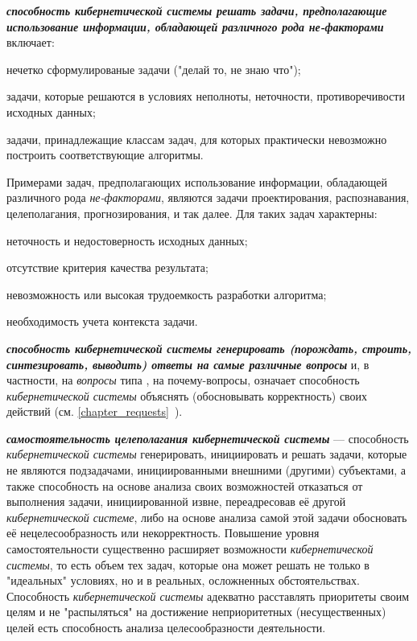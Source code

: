 \textbf{\textit{способность кибернетической системы решать задачи, предполагающие использование информации, обладающей различного рода не-факторами}} включает:
\begin{textitemize}
	\item нечетко сформулированые задачи ("делай то, не знаю что");
	\item задачи, которые решаются в условиях неполноты, неточности, противоречивости исходных данных;
	\item задачи, принадлежащие классам задач, для которых практически невозможно построить соответствующие алгоритмы.
\end{textitemize}
Примерами задач, предполагающих использование информации, обладающей различного рода \textit{не-факторами}, являются задачи проектирования, распознавания, целеполагания, прогнозирования, и так далее.
Для таких задач характерны:
\begin{textitemize}
    \item неточность и недостоверность исходных данных;
    \item отсутствие критерия качества результата;
    \item невозможность или высокая трудоемкость разработки алгоритма;
    \item необходимость учета контекста задачи.
\end{textitemize}

\textbf{\textit{способность кибернетической системы генерировать (порождать, строить, синтезировать, выводить) ответы на самые различные вопросы}} и, в частности, на \textit{вопросы} типа , на почему-вопросы, означает способность \textit{кибернетической системы} объяснять (обосновывать корректность) своих действий (см. \ref{chapter_requests}~).

\textbf{\textit{самостоятельность целеполагания кибернетической системы}} --- способность \textit{кибернетической системы} генерировать, инициировать и решать задачи, которые не являются подзадачами, инициированными внешними (другими) субъектами, а также способность на основе анализа своих возможностей отказаться от выполнения задачи, инициированной извне, переадресовав её другой \textit{кибернетической системе}, либо на основе анализа самой этой задачи обосновать её нецелесообразность или некорректность.  Повышение уровня самостоятельности существенно расширяет возможности \textit{кибернетической системы}, то есть объем тех задач, которые она может решать не только в "идеальных"{} условиях, но и в реальных, осложненных обстоятельствах. Способность \textit{кибернетической системы} адекватно расставлять приоритеты своим целям и не "распыляться"{} на достижение неприоритетных (несущественных) целей есть способность анализа целесообразности деятельности.

